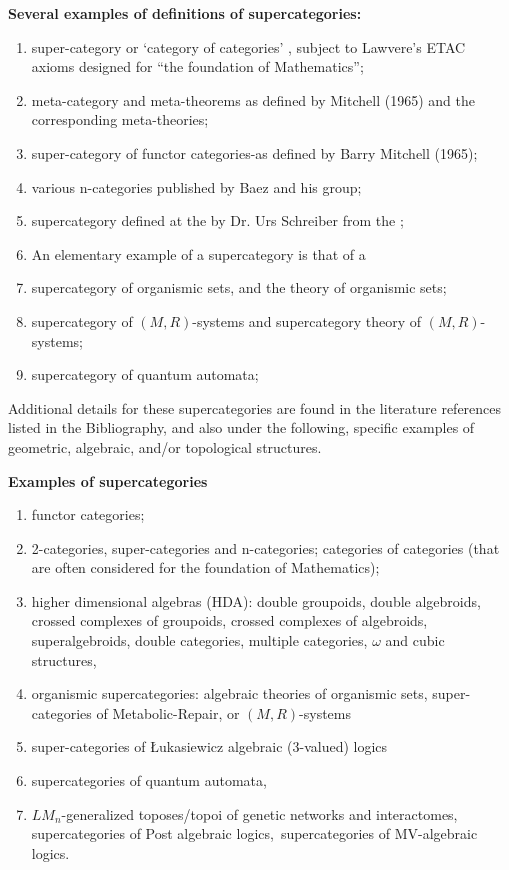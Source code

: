 \documentclass[12pt]{article}
\theoremstyle{plain}
\theoremstyle{definition}
\numberwithin{equation}{section}
\begin{document}
\textbf{Several examples of definitions of supercategories:}
\begin{enumerate}
\item super-category or `category of categories' , subject to Lawvere's ETAC axioms designed for
``the foundation of Mathematics'';

\item meta-category and meta-theorems as defined by Mitchell (1965) and the corresponding meta-theories;

\item super-category of functor categories-as defined by Barry Mitchell (1965);

\item various n-categories published by Baez and his group;

\item supercategory defined at the 
by Dr. Urs Schreiber from the 
;

\item An elementary example of a supercategory is that of a 

\item supercategory of organismic sets, and the theory of organismic sets;

\item supercategory of $(M,R)$-systems and supercategory theory of $(M,R)$-systems;

\item supercategory of quantum automata;
\end{enumerate}
Additional details for these supercategories are found in the literature references listed in the
Bibliography, and also under the following, specific examples of geometric, algebraic, and/or 
topological structures. 

\textbf{Examples of supercategories} 
\begin{enumerate}
\item functor categories; 
\item 2-categories, super-categories and n-categories; categories of categories (that are often considered for the foundation of Mathematics); 
\item higher dimensional algebras (HDA): double groupoids, 
double algebroids, crossed complexes of groupoids, crossed complexes of algebroids, superalgebroids, 
double categories, multiple categories, $\omega$ and cubic structures, 
\item organismic supercategories: algebraic theories of organismic sets, super-categories of Metabolic-Repair, or 
$(M,R)$-systems
\item  super-categories of \L{}ukasiewicz algebraic (3-valued) logics
\item  supercategories of quantum automata,
\item  $LM_n$-generalized toposes/topoi of genetic networks and interactomes, supercategories of Post algebraic logics,\
supercategories of MV-algebraic logics.
\end{enumerate}
\end{document}

